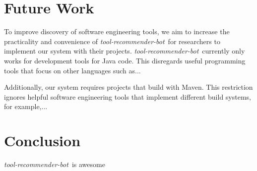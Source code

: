 \documentclass[sigconf,review,anonymous]{acmart}
\newcommand{\tool}{\textsl{tool-recommender-bot}}
\begin{document}
\section{Future Work}

To improve discovery of software engineering tools, we aim to increase the practicality and convenience of \tool~for researchers to implement our system with their projects. \tool~currently only works for development tools for Java code. This disregards useful programming tools that focus on other languages such as...

Additionally, our system requires projects that build with Maven. This restriction ignores helpful software engineering tools that implement different build systems, for example,...

\section{Conclusion}

\tool~is awesome




  
%

\end{document}
